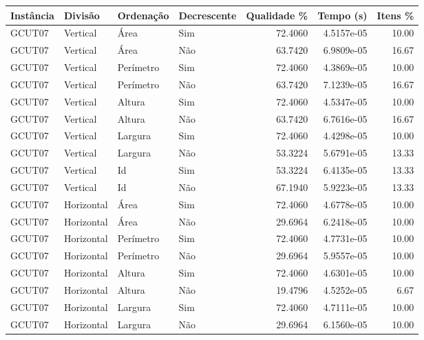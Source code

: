\begin{tabular}{llllrrr}
    \hline
    Instância & Divisão     & Ordenação & Decrescente & Qualidade \% & Tempo (s)  & Itens \% \\
    \hline
    GCUT07    & Vertical    & Área      & Sim         & 72.4060      & 4.5157e-05 & 10.00    \\
    GCUT07    & Vertical    & Área      & Não         & 63.7420      & 6.9809e-05 & 16.67    \\
    GCUT07    & Vertical    & Perímetro & Sim         & 72.4060      & 4.3869e-05 & 10.00    \\
    GCUT07    & Vertical    & Perímetro & Não         & 63.7420      & 7.1239e-05 & 16.67    \\
    GCUT07    & Vertical    & Altura    & Sim         & 72.4060      & 4.5347e-05 & 10.00    \\
    GCUT07    & Vertical    & Altura    & Não         & 63.7420      & 6.7616e-05 & 16.67    \\
    GCUT07    & Vertical    & Largura   & Sim         & 72.4060      & 4.4298e-05 & 10.00    \\
    GCUT07    & Vertical    & Largura   & Não         & 53.3224      & 5.6791e-05 & 13.33    \\
    GCUT07    & Vertical    & Id        & Sim         & 53.3224      & 6.4135e-05 & 13.33    \\
    GCUT07    & Vertical    & Id        & Não         & 67.1940      & 5.9223e-05 & 13.33    \\
    GCUT07    & Horizontal  & Área      & Sim         & 72.4060      & 4.6778e-05 & 10.00    \\
    GCUT07    & Horizontal  & Área      & Não         & 29.6964      & 6.2418e-05 & 10.00    \\
    GCUT07    & Horizontal  & Perímetro & Sim         & 72.4060      & 4.7731e-05 & 10.00    \\
    GCUT07    & Horizontal  & Perímetro & Não         & 29.6964      & 5.9557e-05 & 10.00    \\
    GCUT07    & Horizontal  & Altura    & Sim         & 72.4060      & 4.6301e-05 & 10.00    \\
    GCUT07    & Horizontal  & Altura    & Não         & 19.4796      & 4.5252e-05 & 6.67     \\
    GCUT07    & Horizontal  & Largura   & Sim         & 72.4060      & 4.7111e-05 & 10.00    \\
    GCUT07    & Horizontal  & Largura   & Não         & 29.6964      & 6.1560e-05 & 10.00    \\

\end{tabular}
